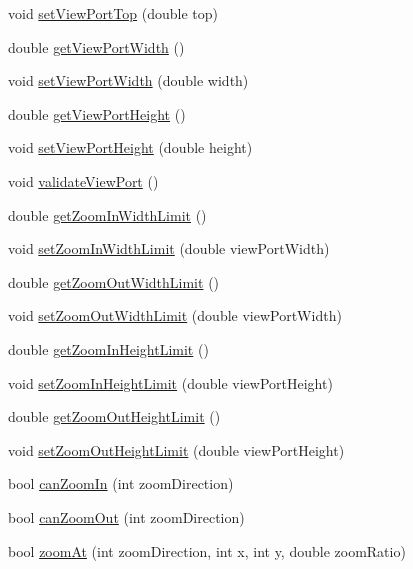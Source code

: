 \begin{DoxyCompactItemize}
void \hyperlink{class_view_port_manager_a367c1ca90319fd6f8261ca5d8fe4a0d3}{set\+View\+Port\+Top} (double top)
\item 
double \hyperlink{class_view_port_manager_a0a3555e1154cb34389ed2cf5b035e687}{get\+View\+Port\+Width} ()
\item 
void \hyperlink{class_view_port_manager_adf549fbcace60757aedebff857d9c0dc}{set\+View\+Port\+Width} (double width)
\item 
double \hyperlink{class_view_port_manager_ad1b3383ca3d0d4a87f1ca56bb8f1cb7e}{get\+View\+Port\+Height} ()
\item 
void \hyperlink{class_view_port_manager_a16729686407f7efaa7bf11e2f912409e}{set\+View\+Port\+Height} (double height)
\item 
void \hyperlink{class_view_port_manager_a5b6604b59e8c04fe2e32b67f12c4c002}{validate\+View\+Port} ()
\item 
double \hyperlink{class_view_port_manager_abb094171925d74b09ca34b4b5516d99a}{get\+Zoom\+In\+Width\+Limit} ()
\item 
void \hyperlink{class_view_port_manager_ab6ea404e7837addeb3d4cf8015adfa4c}{set\+Zoom\+In\+Width\+Limit} (double view\+Port\+Width)
\item 
double \hyperlink{class_view_port_manager_ac9cb2aed6dfbe6dcf2049e8ccf1b8b47}{get\+Zoom\+Out\+Width\+Limit} ()
\item 
void \hyperlink{class_view_port_manager_a05ecf60e99e7ccbc9f84061485d07543}{set\+Zoom\+Out\+Width\+Limit} (double view\+Port\+Width)
\item 
double \hyperlink{class_view_port_manager_a97ddd1d6300e677ae55fd3095c815f3f}{get\+Zoom\+In\+Height\+Limit} ()
\item 
void \hyperlink{class_view_port_manager_aa3522d8d5cccfc890922fcbbe12eb919}{set\+Zoom\+In\+Height\+Limit} (double view\+Port\+Height)
\item 
double \hyperlink{class_view_port_manager_aab5ba83002c831fef3831b883b0908ba}{get\+Zoom\+Out\+Height\+Limit} ()
\item 
void \hyperlink{class_view_port_manager_a050d927a278c1c37dc97ea2ccb00ca17}{set\+Zoom\+Out\+Height\+Limit} (double view\+Port\+Height)
\item 
bool \hyperlink{class_view_port_manager_a93ca31738c1840842ef7b66cd4037b8e}{can\+Zoom\+In} (int zoom\+Direction)
\item 
bool \hyperlink{class_view_port_manager_a34b7404aa68b4a172c9db29f09898637}{can\+Zoom\+Out} (int zoom\+Direction)
\item 
bool \hyperlink{class_view_port_manager_a91160303aebb6d58369175131022b3e6}{zoom\+At} (int zoom\+Direction, int x, int y, double zoom\+Ratio)

\end{DoxyCompactItemize}
